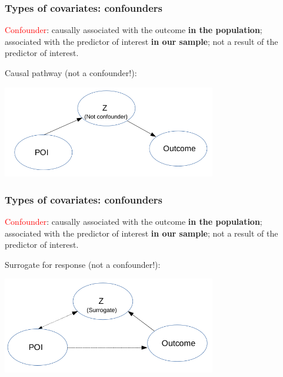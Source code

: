 \documentclass[12pt, 
hyperref={colorlinks=true, linkcolor=blue, urlcolor=cyan},dvipsnames]{beamer}
\begin{document}
\begin{frame}
\frametitle{Types of covariates: confounders}
\textcolor{red}{Confounder}: causally associated with the outcome \textbf{in the population}; associated with the predictor of interest \textbf{in our sample}; not a result of the predictor of interest.

Causal pathway (not a confounder!):

\begin{center}
\includegraphics[width=0.7\textwidth]{plots/causal_pathway.png}
\end{center}

\end{frame}

\begin{frame}
\frametitle{Types of covariates: confounders}
\textcolor{red}{Confounder}: causally associated with the outcome \textbf{in the population}; associated with the predictor of interest \textbf{in our sample}; not a result of the predictor of interest.

Surrogate for response (not a confounder!):

\begin{center}
\includegraphics[width=0.7\textwidth]{plots/surrogate.png}
\end{center}

\end{frame}
\end{document}
